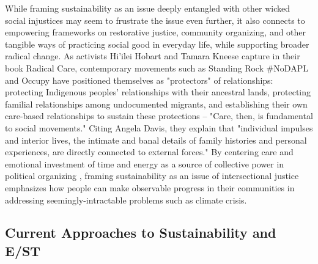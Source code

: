 \documentclass[manuscript,review,anonymous]{acmart}
\begin{document}
While framing sustainability as an issue deeply entangled with other wicked social injustices may seem to frustrate the issue even further, it also connects to empowering frameworks on restorative justice, community organizing, and other tangible ways of practicing social good in everyday life, while supporting broader radical change. As activists Hi'ilei Hobart and Tamara Kneese capture in their book Radical Care, contemporary movements such as Standing Rock \#NoDAPL and Occupy have positioned themselves as "protectors" of relationships: protecting Indigenous peoples' relationships with their ancestral lands, protecting familial relationships among undocumented migrants, and establishing their own care-based relationships to sustain these protections -- "Care, then, is fundamental to social movements." \cite{hobart_radical_2020} Citing Angela Davis, they explain that "individual impulses and interior lives, the intimate and banal details of family histories and personal experiences, are directly connected to external forces." By centering care and emotional investment of time and energy as a source of collective power in political organizing \cite{mcalevey_no_2016, sze_environmental_2020}, framing sustainability as an issue of intersectional justice emphasizes how people can make observable progress in their communities in addressing seemingly-intractable problems such as climate crisis.

\subsection{Current Approaches to Sustainability and E/ST}
\end{document}
